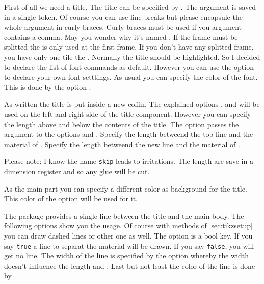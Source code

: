 \documentclass[openany,12pt,tocdepth=3]{ltx-md}
\begin{document}
First of all we need a title. The title can be specified by . The argument
is saved in a single token. Of course you can use line breaks but please encapsule
the whole argument in curly braces. Curly braces must be used if you argument contains
a comma. May you wonder why it's named . If the frame
must be splitted the  is only used at the first frame. If
you don't have any splitted frame, you have only one tile the .
Normally the title should be highlighted. So I decided to declare the list of
font commands as default. However you can use the option  to
declare your own font setttings.
As usual you can specify the color of the font. This is done by the option
.

As written the title is put inside a new coffin. The explained options ,
 and  will be used on the left and right side of
the title component. However you can specify the length above and below the contents of the title. 
The option  passes the argument to the options 
and .
Specify the length betweend the top line and the material of .
Specify the length betweend the new line  and the material of .

\faArrowRight Please note:  I know the name \texttt{skip} leads to irritations. The length are save in a
dimension register and so any glue will be cut.

As the main part you can specify a different color as background for
the title. This color of the option  will be used for it.


The package  provides a single line between the title and the main body.
The following options show you the usage. Of course with methods of
\autoref{sec:tikzsetup} you can draw dashed lines or other one as well.
The option  is a bool key. If you say \texttt{true} a line to separat
the material will be drawn. If you say \texttt{false}, you will get no line.
The width of the line is specified by the option  whereby
the width doesn't influence the length  and .
Last but not least the color of the line is done by .
\end{document}
